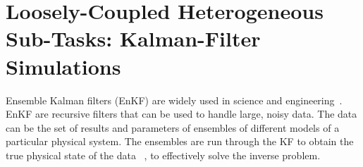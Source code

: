 \documentclass{llncs}
\begin{document}








\section{Loosely-Coupled Heterogeneous Sub-Tasks: Kalman-Filter
  Simulations}

\upp

Ensemble Kalman filters (EnKF) are widely used in science and
engineering~\cite{KalmanPaper}.  EnKF are recursive filters that can
be used to handle large, noisy data. The data can be the set of
results and parameters of ensembles of different models of a
particular physical system. The ensembles are run through the KF to
obtain the true physical state of the data ~\cite{KalmanPaper}, to
effectively solve the inverse problem.
\end{document}
